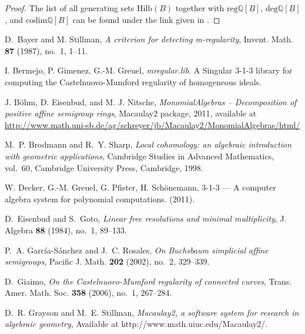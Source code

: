 \documentclass[11pt,a4paper]{amsart}%
\theoremstyle{definition}
\theoremstyle{remark}
\numberwithin{equation}{section}
\theoremstyle{plain}
\begin{document}
\begin{proof}
The list of all generating sets $\mathrm{Hilb}(B)$ together with
$\mathrm{reg}\mathbb{Q}[B]$, $\mathrm{deg}\mathbb{Q}[B]$, and $\mathrm{codim}%
\mathbb{Q}[B]$ can be found under the link given in \cite{BEN}.
\end{proof}




\begin{thebibliography}{00}                                                                                                

D.~Bayer and M. Stillman, \emph{A criterion for detecting m-regularity},
  Invent. Math. \textbf{87} (1987), no.~1, 1--11.
  
I. Bermejo, P. Gimenez, G.-M. Greuel,
\emph{mregular.lib}. {A} {\sc Singular} {3-1-3} library for computing the Castelnuovo-Mumford regularity of homogeneous ideals.
  
  J. B\"{o}hm, D. Eisenbud, and M. J. Nitsche, \emph{MonomialAlgebras -- Decomposition of positive affine semigroup rings},
Macaulay2 package, 2011, available at
\href{http://www.math.uni-sb.de/ag/schreyer/jb/Macaulay2/MonomialAlgebras/html/}{http://www.math.uni-sb.de/ag/schreyer/jb/Macaulay2/MonomialAlgebras/html/}

M.~P. Brodmann and R.~Y. Sharp, \emph{{Local cohomology: an algebraic
  introduction with geometric applications}}, Cambridge Studies in Advanced
  Mathematics, vol.~60, Cambridge University Press, Cambridge, 1998.
  
W. Decker, G.-M. Greuel, G. Pfister, H. Sch{\"o}nemann,
 {3-1-3} --- {A} computer algebra system for polynomial computations.
 (2011).

D.~Eisenbud and S.~Goto, \emph{{Linear free resolutions and minimal
  multiplicity}}, J. Algebra \textbf{88} (1984), no.~1, 89--133.

P.~A. {Garc\'ia-S\'anchez} and J.~C. Rosales, \emph{{On Buchsbaum simplicial
  affine semigroups}}, Pacific J. Math. \textbf{202} (2002), no.~2, 329--339.

D.~Giaimo, \emph{{On the Castelnuovo-Mumford regularity of connected curves}},
  Trans. Amer. Math. Soc. \textbf{358} (2006), no.~1, 267--284.

D.~R. Grayson and M.~E. Stillman, \emph{Macaulay2, a software system for
  research in algebraic geometry}, Available at
  http://www.math.uiuc.edu/Macaulay2/.


\end{thebibliography}
\end{document}
